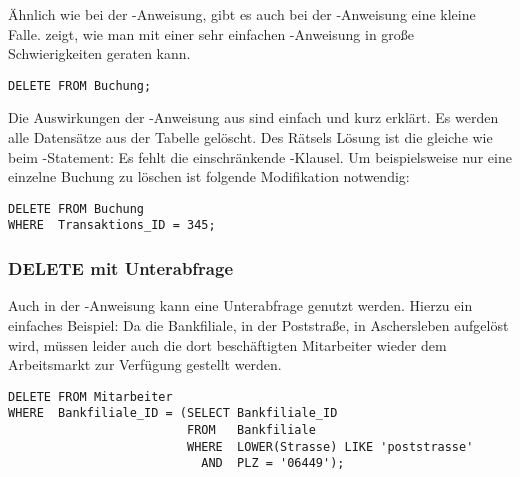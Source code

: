Ähnlich wie bei der \UPDATE-Anweisung, gibt es auch bei der
\DELETE-Anweisung eine kleine Falle.  zeigt, wie man
mit einer sehr einfachen \DELETE-Anweisung in große Schwierigkeiten
geraten kann.
\begin{lstlisting}[language=oracle_sql,caption={Eine tödliche \DELETE-Anweisung},label=sql07_20]
DELETE FROM Buchung;
        \end{lstlisting}
Die Auswirkungen der \DELETE-Anweisung aus  sind
einfach und kurz erklärt. Es werden alle Datensätze aus der Tabelle
 gelöscht. Des Rätsels Lösung ist die gleiche
wie beim \UPDATE-Statement: Es fehlt die einschränkende
\WHERE-Klausel. Um beispielsweise nur eine einzelne Buchung zu löschen
ist folgende Modifikation notwendig:
\begin{lstlisting}[language=oracle_sql,caption={Schon viel besser!!!},label=sql07_21]
DELETE FROM Buchung
WHERE  Transaktions_ID = 345;
        \end{lstlisting}
\subsubsection{DELETE mit Unterabfrage}
Auch in der \DELETE-Anweisung kann eine Unterabfrage genutzt werden.
Hierzu ein einfaches Beispiel: Da die Bankfiliale, in der
Poststraße, in Aschersleben aufgelöst wird, müssen leider auch
die dort beschäftigten Mitarbeiter wieder dem Arbeitsmarkt zur
Verfügung gestellt werden.
\begin{lstlisting}[language=oracle_sql,caption={\DELETE{} mit Unterabfrage},label=sql07_22]
DELETE FROM Mitarbeiter
WHERE  Bankfiliale_ID = (SELECT Bankfiliale_ID
                         FROM   Bankfiliale
                         WHERE  LOWER(Strasse) LIKE 'poststrasse'
                           AND  PLZ = '06449');
          \end{lstlisting}
